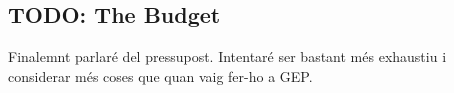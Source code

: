  
\subsection{TODO: The Budget}

Finalemnt parlaré del pressupost. Intentaré ser bastant més exhaustiu i
considerar més coses que quan vaig fer-ho a GEP.

